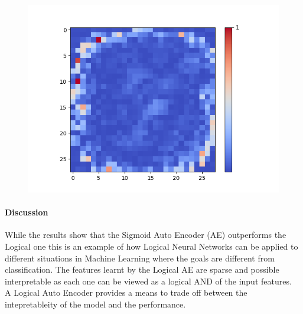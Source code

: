 \begin{figure}[H]
\begin{minipage}[b]{0.19\textwidth}
		\includegraphics[width=\textwidth]{SAE(20LF)/Feature-15.png}
		\label{}
	\end{minipage}
	
	\hfill
\end{figure}

\paragraph{Discussion}
While the results show that the Sigmoid Auto Encoder (AE) outperforms the Logical one this is an example of how Logical Neural Networks can be applied to different situations in Machine Learning where the goals are different from classification. The features learnt by the Logical AE are sparse and possible interpretable as each one can be viewed as a logical AND of the input features.\\

A Logical Auto Encoder provides a means to trade off between the intepretableity of the model and the performance.
